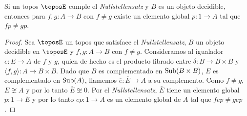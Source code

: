 \begin{proposition}
  Si un topos $\toposE$ cumple el \textit{Nullstellensatz} y $B$ es un objeto decidible, entonces para $f,g\colon A\to B$
  con $f\neq g$ existe un elemento global $p\colon 1\to A$ tal que $f p \neq g p$.
\end{proposition}
\begin{proof}
  Sea $\toposE$ un topos que satisface el \textit{Nullstellensatz}, $B$ un objeto decidible en $\toposE$ y $f,g\colon A\to B$ con $f\neq g$. Consideramos al igualador $e\colon E\to A$ de $f$ y $g$, 
  quien de hecho es el producto fibrado entre $\delta\colon B\to B\times B$ y $\langle f,g\rangle\colon A\to B\times B$.
  Dado que $B$ es complementado en $\operatorname{Sub}(B\times B)$, $E$ es complementado en $\operatorname{Sub}(A)$, llamemos $\overline{e}\colon \overline{E}\to A$ a su complemento.
  Como $f\neq g$, $E\not\cong A$ y por lo tanto $\overline{E}\not\cong 0$. Por el \textit{Nullstellensatz}, $\overline{E}$ tiene un elemento global $p\colon 1\to \overline{E}$ y por lo tanto $e p\colon 1\to A$ es un elemento global de $A$ tal que $f e p \neq g e p$.
\end{proof}







